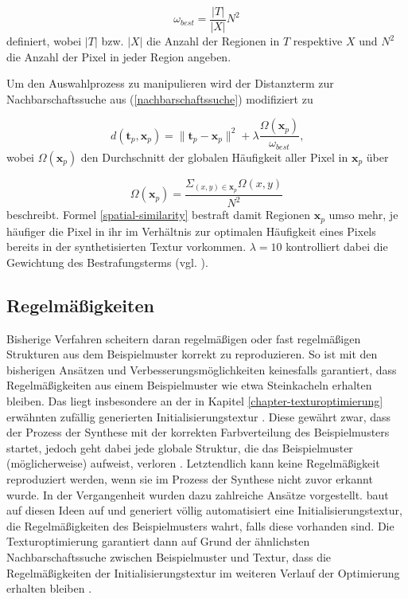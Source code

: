 \begin{equation*}
	\omega_{\textit{best}} = \frac{|T|}{|X|}N^2
\end{equation*}
definiert, wobei $|T|$ bzw. $|X|$ die Anzahl der Regionen in $T$ respektive $X$ und $N^2$ die Anzahl der Pixel in jeder Region angeben.

Um den Auswahlprozess zu manipulieren wird der Distanzterm zur Nachbarschaftssuche aus (\ref{nachbarschaftssuche}) modifiziert zu

\begin{equation}
	d(\textbf{t}_p, \textbf{x}_p) = \lVert \textbf{t}_p - \textbf{x}_p \rVert^2 + \lambda \frac{\Omega(\textbf{x}_p)}{\omega_{\textit{best}}}\text{,}
	\label{spatial-similarity}
\end{equation}
wobei $\Omega(\textbf{x}_p)$ den Durchschnitt der globalen Häufigkeit aller Pixel in $\textbf{x}_p$ über

\begin{equation*}
	\Omega(\textbf{x}_p) = \frac{\Sigma_{(x,y) \in \textbf{x}_p}\Omega(x,y)}{N^2}
\end{equation*}
beschreibt.
Formel \ref{spatial-similarity} bestraft damit Regionen $\textbf{x}_p$ umso mehr, je häufiger die Pixel in ihr im Verhältnis zur optimalen Häufigkeit eines Pixels bereits in der synthetisierten Textur vorkommen.
$\lambda = 10$ kontrolliert dabei die Gewichtung des Bestrafungsterms (vgl. \cite{SelfTuning}).

\subsection{Regelmäßigkeiten}

Bisherige Verfahren scheitern daran regelmäßigen oder fast regelmäßigen Strukturen aus dem Beispielmuster korrekt zu reproduzieren.
So ist mit den bisherigen Ansätzen und Verbesserungsmöglichkeiten keinesfalls garantiert, dass Regelmäßigkeiten aus einem Beispielmuster wie etwa Steinkacheln erhalten bleiben.
Das liegt insbesondere an der in Kapitel \ref{chapter-texturoptimierung} erwähnten zufällig generierten Initialisierungstextur \cite{SelfTuning}.
Diese gewährt zwar, dass der Prozess der Synthese mit der korrekten Farbverteilung des Beispielmusters startet, jedoch geht dabei jede globale Struktur, die das Beispielmuster (möglicherweise) aufweist, verloren \cite{SelfTuning}.
Letztendlich kann keine Regelmäßigkeit reproduziert werden, wenn sie im Prozess der Synthese nicht zuvor erkannt wurde.
In der Vergangenheit wurden dazu zahlreiche Ansätze vorgestellt.
\cite{SelfTuning} baut auf diesen Ideen auf und generiert völlig automatisiert eine  Initialisierungstextur, die Regelmäßigkeiten des Beispielmusters wahrt, falls diese vorhanden sind.
Die Texturoptimierung garantiert dann auf Grund der ähnlichsten Nachbarschaftssuche zwischen Beispielmuster und Textur, dass die Regelmäßigkeiten der Initialisierungstextur im weiteren Verlauf der Optimierung erhalten bleiben \cite{SelfTuning}.

